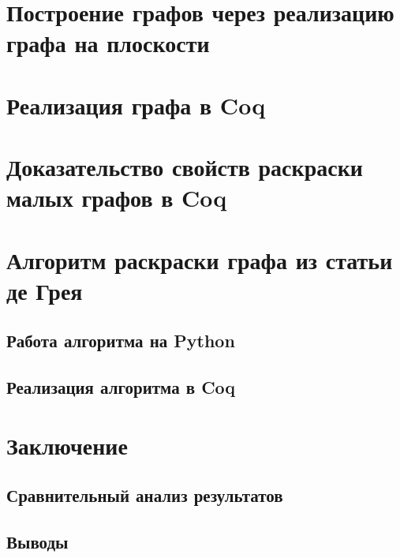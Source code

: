 

\chapter{Построение графов через реализацию графа на плоскости}

\chapter{Реализация графа в Coq}


\chapter{Доказательство свойств раскраски малых графов в Coq}

\chapter{Алгоритм раскраски графа из статьи де Грея}

\section{Работа алгоритма на Python}
\section{Реализация алгоритма в Coq}
\label{chapt1}





\chapter{Заключение}

\section{Сравнительный анализ результатов}

\section{Выводы}

\label{chapt1}
